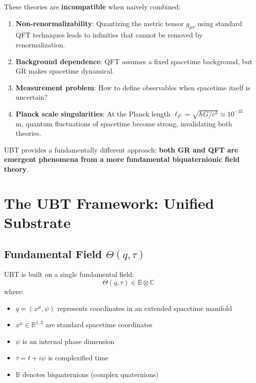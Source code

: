 \documentclass[12pt]{article}
\begin{document}
These theories are \textbf{incompatible} when naively combined:
\begin{enumerate}
    \item \textbf{Non-renormalizability}: Quantizing the metric tensor $g_{\mu\nu}$ using standard QFT techniques leads to infinities that cannot be removed by renormalization.
    
    \item \textbf{Background dependence}: QFT assumes a fixed spacetime background, but GR makes spacetime dynamical.
    
    \item \textbf{Measurement problem}: How to define observables when spacetime itself is uncertain?
    
    \item \textbf{Planck scale singularities}: At the Planck length $\ell_P = \sqrt{\hbar G/c^3} \approx 10^{-35}$ m, quantum fluctuations of spacetime become strong, invalidating both theories.
\end{enumerate}

UBT provides a fundamentally different approach: \textbf{both GR and QFT are emergent phenomena from a more fundamental biquaternionic field theory}.

\section{The UBT Framework: Unified Substrate}

\subsection{Fundamental Field $\Theta(q, \tau)$}

UBT is built on a single fundamental field:
\begin{equation}
    \Theta(q, \tau) \in \mathbb{B} \otimes \mathbb{C}
\end{equation}
where:
\begin{itemize}
    \item $q = (x^\mu, \psi)$ represents coordinates in an extended spacetime manifold
    \item $x^\mu \in \mathbb{R}^{1,3}$ are standard spacetime coordinates
    \item $\psi$ is an internal phase dimension
    \item $\tau = t + i\psi$ is complexified time
    \item $\mathbb{B}$ denotes biquaternions (complex quaternions)
\end{itemize}
\end{document}
